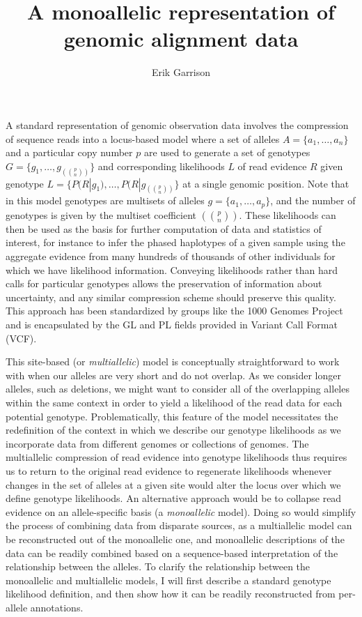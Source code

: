 \documentclass{article}
\begin{document}
\title{A monoallelic representation of genomic alignment data}

\author{Erik Garrison}

\maketitle

A standard representation of genomic observation data involves the compression of sequence reads into a locus-based model where a set of alleles $A = \{ a_1, \ldots, a_n \}$ and a particular copy number $p$ are used to generate a set of genotypes $G = \{ g_1, \ldots, g_{\left({p \choose n}\right)} \}$ and corresponding likelihoods $L$ of read evidence $R$ given genotype $L = \{ P(R|g_1), \ldots, P(R|g_{ \left({p \choose n}\right) } \}$ at a single genomic position. Note that in this model genotypes are multisets of alleles $g = \{ a_1, \dots, a_p \}$, and the number of genotypes is given by the multiset coefficient $\left({p \choose n}\right)$. These likelihoods can then be used as the basis for further computation of data and statistics of interest, for instance to infer the phased haplotypes of a given sample using the aggregate evidence from many hundreds of thousands of other individuals for which we have likelihood information. Conveying likelihoods rather than hard calls for particular genotypes allows the preservation of information about uncertainty, and any similar compression scheme should preserve this quality. This approach has been standardized by groups like the 1000 Genomes Project and is encapsulated by the GL and PL fields provided in Variant Call Format (VCF).

This site-based (or \emph{multiallelic}) model is conceptually straightforward to work with when our alleles are very short and do not overlap. As we consider longer alleles, such as deletions, we might want to consider all of the overlapping alleles within the same context in order to yield a likelihood of the read data for each potential genotype. Problematically, this feature of the model necessitates the redefinition of the context in which we describe our genotype likelihoods as we incorporate data from different genomes or collections of genomes. The multiallelic compression of read evidence into genotype likelihoods thus requires us to return to the original read evidence to regenerate likelihoods whenever changes in the set of alleles at a given site would alter the locus over which we define genotype likelihoods. An alternative approach would be to collapse read evidence on an allele-specific basis (a \emph{monoallelic} model). Doing so would simplify the process of combining data from disparate sources, as a multiallelic model can be reconstructed out of the monoallelic one, and monoallelic descriptions of the data can be readily combined based on a sequence-based interpretation of the relationship between the alleles. To clarify the relationship between the monoallelic and multiallelic models, I will first describe a standard genotype likelihood definition, and then show how it can be readily reconstructed from per-allele annotations.
\end{document}
